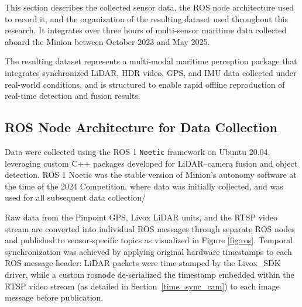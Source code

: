 \documentclass{erauthesis}
\begin{document}


This section describes the collected sensor data, the ROS node architecture used to record it, 
and the organization of the resulting dataset used throughout this research.  
It integrates over three hours of multi-sensor maritime data collected aboard the Minion between October 2023 and May 2025.

The resulting dataset represents a multi-modal maritime perception package that integrates synchronized LiDAR, HDR video, GPS, and IMU data collected under real-world conditions, and is structured to enable rapid offline reproduction of real-time detection and fusion results.


\subsection{ROS Node Architecture for Data Collection}
\label{sec:ros_architecture}

Data were collected using the ROS 1 \texttt{Noetic} framework on Ubuntu 20.04, 
leveraging custom C++ packages developed for LiDAR–camera fusion and object detection.  
ROS 1 Noetic was the stable version of Minion's autonomy software at the time of the 2024 Competition, where data was initially collected, and was used for all subsequent data collection/%

Raw data from the Pinpoint GPS, Livox LiDAR units, and the RTSP video stream are converted into individual ROS messages through separate ROS nodes and published to sensor-specific topics as visualized in Figure \ref{fig:ros}.  
Temporal synchronization was achieved by applying  original hardware timestamps to each ROS message header: LiDAR packets were time-stamped by the Livox\_SDK driver, while a custom rosnode de-serialized the timestamp embedded within the \ac{RTSP} video stream (as detailed in Section~\ref{time_sync_cam}) to each image message before publication.
\end{document}

